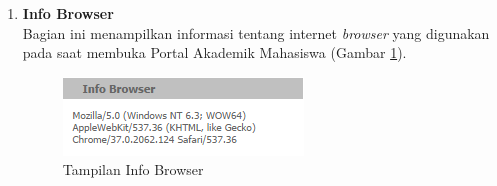 \begin{enumerate}
	\item \textbf{Info Browser}\\
		Bagian ini menampilkan informasi tentang internet \textit{browser} yang digunakan pada saat membuka Portal Akademik Mahasiswa (Gambar \ref{fig:3_pam_utama_infobrowser}). 
		\begin{figure}[H]
				\centering
				\includegraphics[scale=0.75]{Gambar/pam-utama-infobrowser}
				\caption{Tampilan Info Browser} 
				\label{fig:3_pam_utama_infobrowser}
			\end{figure}
\end{enumerate}

